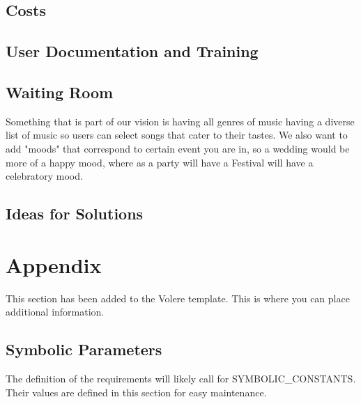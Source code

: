 \documentclass[12pt, titlepage]{article}
\begin{document}
\subsection{Costs}

\subsection{User Documentation and Training}

\subsection{Waiting Room}
Something that is part of our vision is having all genres of music having a diverse list of music so users can select songs that cater to their tastes. We also want to add "moods" that correspond to certain event you are in, so a wedding would be more of a happy mood, where as a party will have a Festival will have a celebratory mood. 
\subsection{Ideas for Solutions}





\newpage

\section{Appendix}

This section has been added to the Volere template.  This is where you can place
additional information.

\subsection{Symbolic Parameters}

The definition of the requirements will likely call for SYMBOLIC\_CONSTANTS.
Their values are defined in this section for easy maintenance.
\end{document}
